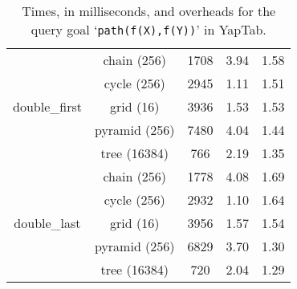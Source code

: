 \begin{table}[ht]
{\begin{tabular}{cc|ccc}
   \multirow{5}{*}{double\_first} &  \footnotesize{chain (256)} & 1708 &  3.94  &  1.58 \\
   &  \footnotesize{cycle (256)} & 2945 &  1.11  &  1.51 \\
   &  \footnotesize{grid (16)} & 3936 &  1.53  &  1.53 \\
   &  \footnotesize{pyramid (256)} & 7480 &  4.04  &  1.44 \\
   &  \footnotesize{tree (16384)} & 766 &  2.19  &  1.35 \\
   \hline
   \multirow{5}{*}{double\_last} &  \footnotesize{chain (256)} & 1778 &  4.08  &  1.69 \\
   &  \footnotesize{cycle (256)} & 2932 &  1.10  &  1.64 \\
   &  \footnotesize{grid (16)} & 3956 &  1.57  &  1.54 \\
   &  \footnotesize{pyramid (256)} & 6829 &  3.70  &  1.30 \\
   &  \footnotesize{tree (16384)} & 720 &  2.04  &  1.29 \\
   \hline
\hline
\end{tabular}
}
\caption{Times, in milliseconds, and overheads for the query goal `\texttt{path(f(X),f(Y))}' in YapTab.}
\label{tbl:results_detail_stst}
\end{table}